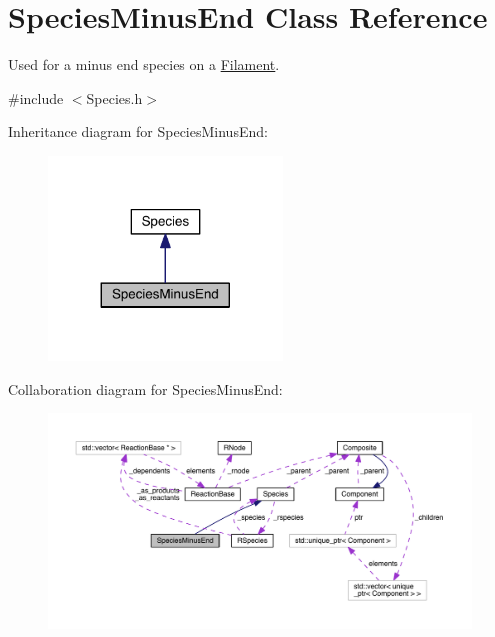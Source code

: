 \hypertarget{classSpeciesMinusEnd}{\section{Species\+Minus\+End Class Reference}
\label{classSpeciesMinusEnd}
}


Used for a minus end species on a \hyperlink{classFilament}{Filament}.  




{\ttfamily \#include $<$Species.\+h$>$}



Inheritance diagram for Species\+Minus\+End\+:\nopagebreak
\begin{figure}[H]
\begin{center}
\leavevmode
\includegraphics[width=176pt]{classSpeciesMinusEnd__inherit__graph}
\end{center}
\end{figure}


Collaboration diagram for Species\+Minus\+End\+:\nopagebreak
\begin{figure}[H]
\begin{center}
\leavevmode
\includegraphics[width=350pt]{classSpeciesMinusEnd__coll__graph}
\end{center}
\end{figure}
